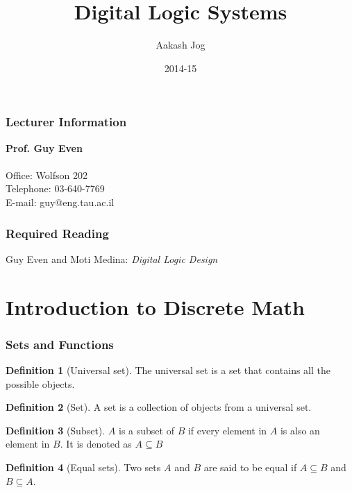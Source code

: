 \documentclass[fleqn, a4paper, 12pt, twoside]{article}
\title{Digital Logic Systems}
\author{Aakash Jog}
\date{2014-15}
\theoremstyle{definition}
\newtheorem{definition}{Definition}
\theoremstyle{theorem}
\begin{document}
\maketitle

\tableofcontents

\newpage
\section{Lecturer Information}

\textbf{Prof. Guy Even}\\
~\\
Office: Wolfson 202\\
Telephone: 03-640-7769\\
E-mail: guy@eng.tau.ac.il\\

\section{Required Reading}

Guy Even and Moti Medina: \textit{Digital Logic Design}

\newpage
\part{Introduction to Discrete Math}

\section{Sets and Functions}

\begin{definition}[Universal set]
	The universal set is a set that contains all the possible objects.
\end{definition}

\begin{definition}[Set]
	A set is a collection of objects from a universal set.
\end{definition}

\begin{definition}[Subset]
	$A$ is a subset of $B$ if every element in $A$ is also an element in $B$. It is denoted as $A \subseteq B$
\end{definition}

\begin{definition}[Equal sets]
	Two sets $A$ and $B$ are said to be equal if $A \subseteq B$ and $B \subseteq A$.
\end{definition}
\end{document}
